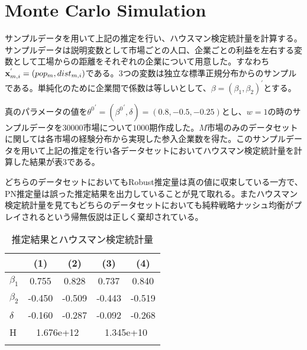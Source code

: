 
\section{Monte Carlo Simulation}
サンプルデータを用いて上記の推定を行い、ハウスマン検定統計量を計算する。サンプルデータは説明変数として市場ごとの人口、企業ごとの利益を左右する変数として工場からの距離をそれぞれの企業について用意した。すなわち${\bf x}_{m, i}^{'} = (pop_m, dist_{m, i})$である。$3$つの変数は独立な標準正規分布からのサンプルである。単純化のために企業間で係数は等しいとして、$\beta = (\beta_1, \beta_2)^{'}$とする。

真のパラメータの値を${\theta^0}^{'} = ({\beta^0}^{'}, \delta) = (0.8, -0.5, -0.25)$とし、$w = 1$の時のサンプルデータを$30000$市場について$1000$期作成した。$M$市場のみのデータセットに関しては各市場の経験分布から実現した参入企業数を得た。このサンプルデータを用いて上記の推定を行い各データセットにおいてハウスマン検定統計量を計算した結果が表$3$である。

どちらのデータセットにおいてもRobust推定量は真の値に収束している一方で、PN推定量は誤った推定結果を出力していることが見て取れる。またハウスマン検定統計量を見てもどちらのデータセットにおいても純粋戦略ナッシュ均衡がプレイされるという帰無仮説は正しく棄却されている。

\begin{table}[t]
\begin{minipage}{\textwidth}
\centering
\def\sym#1{\ifmmode^{#1}\else\(^{#1}\)\fi}
\caption{推定結果とハウスマン検定統計量}
\begin{tabular}{l*{4}{c}}
\hline\hline
            &\multicolumn{1}{c}{(1)}&\multicolumn{1}{c}{(2)}&\multicolumn{1}{c}{(3)}&\multicolumn{1}{c}{(4)}\\
\hline
$\beta_1$&        0.755         &       0.828        &      0.737  &     0.840  \\
[1em]
$\beta_2$      &        -0.450          &       -0.509        &       -0.443        &       -0.519         \\
[1em]
$\delta$&        -0.160         &       -0.287        &       -0.092         &       -0.268        \\
\hline
H      &        \multicolumn{2}{c}{1.676e+12}       &         \multicolumn{2}{c}{1.345e+10}        \\
\hline\hline\\
\end{tabular}
\end{minipage}
\end{table}

